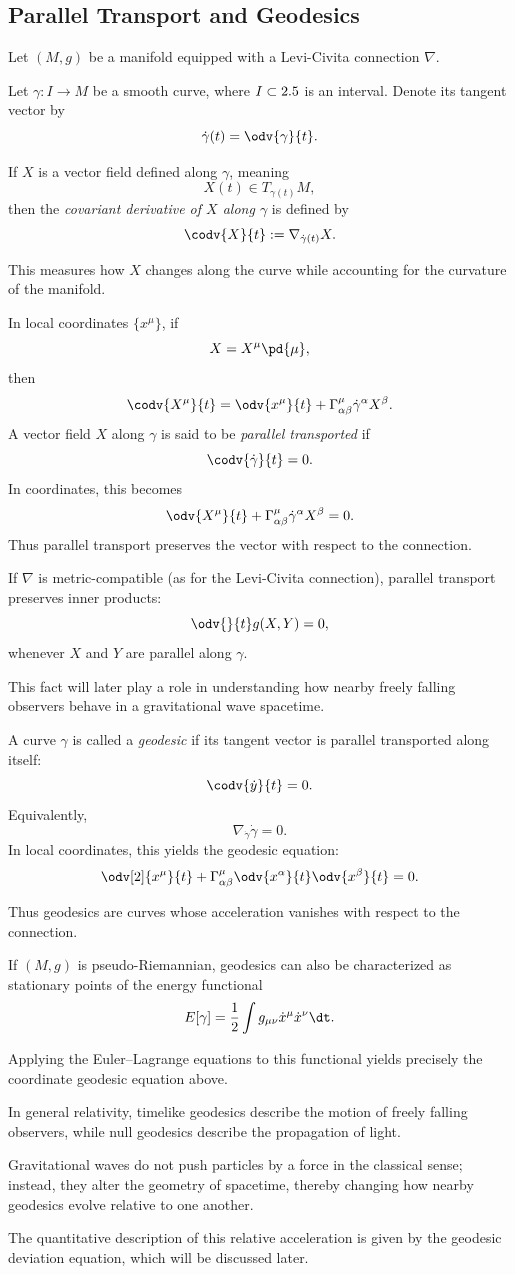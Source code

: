 \subsection{Parallel Transport and Geodesics} Let $(M, g)$ be a manifold equipped with a Levi-Civita connection $\nabla$.

Let $\gamma : I \to M$ be a smooth curve, where $I \subset 2.5$ is an interval. Denote its tangent vector by
\[%
  \dot{\gamma}(t) = \odv{\gamma}{t}
.\]%

If $X$ is a vector field defined along $\gamma$, meaning
\[%
  X(t) \in T_{\gamma(t)} M
,\]%
then the \emph{covariant derivative of $X$ along $\gamma$} is defined by
\[%
  \codv{X}{t} := \nabla_{\dot{\gamma}(t)} X
.\]%

This measures how $X$ changes along the curve while accounting for the curvature of the manifold.

In local coordinates $\{x^\mu\}$, if
\[%
  X = X^\mu \pd{\mu}
,\]%
then
\[%
  \codv{X^\mu}{t} = \odv{x^\mu}{t} + \Gamma^\mu_{\alpha\beta} \dot{\gamma}^\alpha X^\beta
.\]%
A vector field $X$ along $\gamma$ is said to be \emph{parallel transported} if
\[%
  \codv{\dot{\gamma}}{t} = 0
.\]%
In coordinates, this becomes
\[%
  \odv{X^\mu}{t}
  +
  \Gamma^\mu_{\alpha\beta}
  \dot{\gamma}^\alpha
  X^\beta
  =
  0.
\]%
Thus parallel transport preserves the vector with respect to the connection.

If $\nabla$ is metric-compatible (as for the Levi-Civita connection), parallel transport preserves inner products:
\[%
  \odv{}{t} g(X, Y) = 0
,\]%
whenever $X$ and $Y$ are parallel along $\gamma$.

This fact will later play a role in understanding how nearby freely falling observers behave in a gravitational wave spacetime.

A curve $\gamma$ is called a \emph{geodesic} if its tangent vector is parallel transported along itself:
\[%
  \codv{\dot{y}}{t} = 0
.\]%
Equivalently,
\[%
  \nabla_{\dot{\gamma}} \dot{\gamma} = 0
.\]%
In local coordinates, this yields the geodesic equation:
\[%
  \odv[2]{x^\mu}{t} + \Gamma^\mu_{\alpha\beta} \odv{x^\alpha}{t} \odv{x^\beta}{t} = 0
.\]%

Thus geodesics are curves whose acceleration vanishes with respect to the connection.

If $(M, g)$ is pseudo-Riemannian, geodesics can also be characterized as stationary points of the energy functional
\[%
  E[\gamma] = \frac{1}{2} \int g_{\mu\nu} \dot{x}^\mu \dot{x}^\nu \dt
.\]%

Applying the Euler–Lagrange equations to this functional yields precisely the coordinate geodesic equation above.

In general relativity, timelike geodesics describe the motion of freely falling observers, while null geodesics describe the propagation of light.

Gravitational waves do not push particles by a force in the classical sense; instead, they alter the geometry of spacetime, thereby changing how nearby geodesics evolve relative to one another.

The quantitative description of this relative acceleration is given by the geodesic deviation equation, which will be discussed later.
